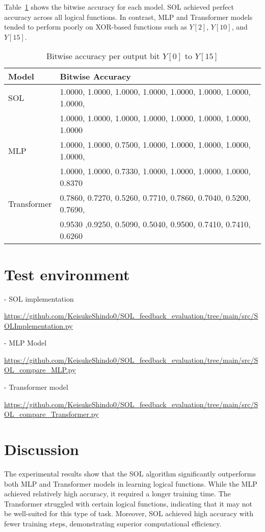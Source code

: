 \documentclass[11pt]{article}
\begin{document}
Table~\ref{fig:bitwise} shows the bitwise accuracy for each model. SOL achieved perfect accuracy across all logical functions. In contrast, MLP and Transformer models tended to perform poorly on XOR-based functions such as $Y[2]$, $Y[10]$, and $Y[15]$.

\begin{table}[H]
\centering
\caption{Bitwise accuracy per output bit $Y[0]$ to $Y[15]$}
\label{fig:bitwise}
\begin{tabular}{ll}
\toprule
\textbf{Model} & \textbf{Bitwise Accuracy} \\
\midrule
SOL & 1.0000, 1.0000, 1.0000, 1.0000, 1.0000, 1.0000, 1.0000, 1.0000, \\
    & 1.0000, 1.0000, 1.0000, 1.0000, 1.0000, 1.0000, 1.0000, 1.0000 \\
MLP & 1.0000, 1.0000, 0.7500, 1.0000, 1.0000, 1.0000, 1.0000, 1.0000, \\
    & 1.0000, 1.0000, 0.7330, 1.0000, 1.0000, 1.0000, 1.0000, 0.8370 \\
Transformer & 0.7860, 0.7270, 0.5260, 0.7710, 0.7860, 0.7040, 0.5200, 0.7690, \\
	& 0.9530 ,0.9250, 0.5090, 0.5040, 0.9500, 0.7410, 0.7410, 0.6260 \\
\bottomrule
\end{tabular}
\end{table}

\section{Test environment}

- SOL implementation 

\url{https://github.com/KeisukeShindo0/SOL_feedback_evaluation/tree/main/src/SOLImplementation.py}

- MLP Model  

\url{https://github.com/KeisukeShindo0/SOL_feedback_evaluation/tree/main/src/SOL_compare_MLP.py}

- Transformer model 
 
\url{https://github.com/KeisukeShindo0/SOL_feedback_evaluation/tree/main/src/SOL_compare_Transformer.py}

\section{Discussion}
The experimental results show that the SOL algorithm significantly outperforms both MLP and Transformer models in learning logical functions. While the MLP achieved relatively high accuracy, it required a longer training time. The Transformer struggled with certain logical functions, indicating that it may not be well-suited for this type of task. Moreover, SOL achieved high accuracy with fewer training steps, demonstrating superior computational efficiency.
\end{document}
